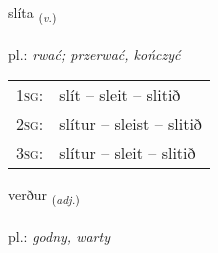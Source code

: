 \documentclass[frontgrid, backgrid]{flacards}\usepackage[]{graphicx}\usepackage[]{xcolor}
\begin{document}
\renewcommand{\flhead}{\vskip5pt \fboxsep=0pt {\small\bfseries\footnotesize Sagnorð | Verb}}
\renewcommand{\fcfoot}{\vskip5pt \fboxsep=0pt \hspace{2pt}{\small\bfseries\footnotesize 2K}}

\renewcommand{\blhead}{\vskip5pt {\small\bfseries\footnotesize Sagnorð | Verb }}
\renewcommand{\bcfoot}{\vskip5pt \hspace{2pt}{\small\bfseries\footnotesize 2K}}


{slíta \small{\textsubscript{(\textit{v.})}} \\[1ex] %
\textphonetic{[stliːta]} \\
pl.: \emph{rwać; przerwać, kończyć} \\  [2ex]
\renewcommand*{\arraystretch}{0.8}
\begin{tabular}{p{1cm}l}
\textsc{1sg}: & slít -- sleit -- slitið \\ 
\textsc{2sg}: & slítur -- sleist -- slitið \\ 
\textsc{3sg}: & slítur -- sleit -- slitið \\ 
\end{tabular}
}

\renewcommand{\flhead}{\vskip5pt \fboxsep=0pt {\small\bfseries\footnotesize Lýsingarorð | Adjective}}
\renewcommand{\fcfoot}{\vskip5pt \fboxsep=0pt \hspace{2pt}{\small\bfseries\footnotesize 2K}}

\renewcommand{\blhead}{\vskip5pt {\small\bfseries\footnotesize Lýsingarorð | Adjective }}
\renewcommand{\bcfoot}{\vskip5pt \hspace{2pt}{\small\bfseries\footnotesize 2K}}


{verður \small{\textsubscript{(\textit{adj.})}} \\[1ex] %
\textphonetic{[vɛrðʏr]} \\
pl.: \emph{godny, warty} \\  [2ex]
\renewcommand*{\arraystretch}{0.8}
}
\end{document}
